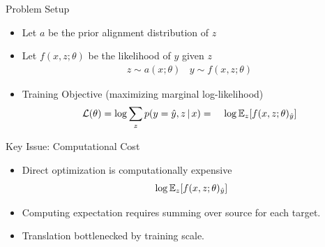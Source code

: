 \begin{frame}{Problem Setup}
\begin{itemize}
\item Let $a$ be the prior alignment distribution of $z$
\item Let $f(x,z;\theta)$ be the likelihood of $y$ given $z$
    \begin{eqnarray*}
        z \sim a(x;\theta ) \ \ \ \  y \sim f(x, z; \theta)
    \end{eqnarray*}
\item Training Objective (maximizing marginal log-likelihood)
    \begin{eqnarray*}
        {\cal L}(\theta) =  \log \sum_z p(y = \hat{y}, z \,|\,  x) &=&  \ \log \mathbb{E}_z [f(x, z;\theta)_{\hat{y}}]
    \end{eqnarray*}

\begin{figure}
\centering
{}
\end{figure}


\end{itemize}
\end{frame}


\begin{frame}{Key Issue: Computational Cost}

  \begin{itemize}
  \item Direct optimization is computationally expensive
    \[  \ \log \mathbb{E}_z [f(x, z;\theta)_{\hat{y}}]\]


  \item Computing expectation requires summing over source for each target.
    \air

  \item Translation bottlenecked by training scale.
  \end{itemize}

\end{frame}

